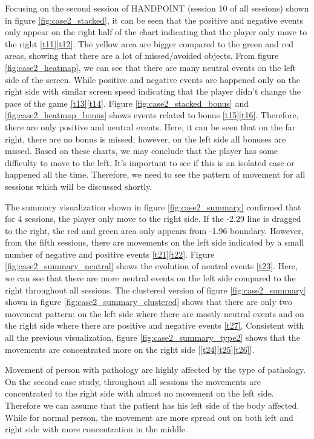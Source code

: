Focusing on the second session of HANDPOINT (session 10 of all sessions) shown in figure \ref{fig:case2_stacked}, it can be seen that the positive and negative events only appear on the right half of the chart indicating that the player only move to the right \ref{t11}\ref{t12}. The yellow area are bigger compared to the green and red areas, showing that there are a lot of missed/avoided objects. From figure \ref{fig:case2_heatmap}, we can see that there are many neutral events on the left side of the screen. While positive and negative events are happened only on the right side with similar screen speed indicating that the player didn't change the pace of the game \ref{t13}\ref{t14}. Figure \ref{fig:case2_stacked_bonus} and \ref{fig:case2_heatmap_bonus} shows events related to bonus \ref{t15}\ref{t16}. Therefore, there are only positive and neutral events. Here, it can be seen that on the far right, there are no bonus is missed, however, on the left side all bonuses are missed. Based on these charts, we may conclude that the player has some difficulty to move to the left. It's important to see if this is an isolated case or happened all the time. Therefore, we need to see the pattern of movement for all sessions which will be discussed shortly.

The summary visualization shown in figure \ref{fig:case2_summary} confirmed that for 4 sessions, the player only move to the right side. If the -2.29 line is dragged to the right, the red and green area only appears from -1.96 boundary. However, from the fifth sessions, there are movements on the left side indicated by a small number of negative and positive events \ref{t21}\ref{t22}. Figure \ref{fig:case2_summary_neutral} shows the evolution of neutral events \ref{t23}. Here, we can see that there are more neutral events on the left side compared to the right throughout all sessions. The clustered version of figure \ref{fig:case2_summary} shown in figure \ref{fig:case2_summary_clustered} shows that there are only two movement pattern: on the left side where there are mostly neutral events and on the right side where there are positive and negative events \ref{t27}. Consistent with all the previous visualization, figure \ref{fig:case2_summary_type2} shows that the movements are concentrated more on the right side [\ref{t24}\ref{t25}\ref{t26}].

Movement of person with pathology are highly affected by the type of pathology. On the second case study, throughout all sessions the movements are concentrated to the right side with almost no movement on the left side. Therefore we can assume that the patient has his left side of the body affected. While for normal person, the movement are more spread out on both left and right side with more concentration in the middle.




